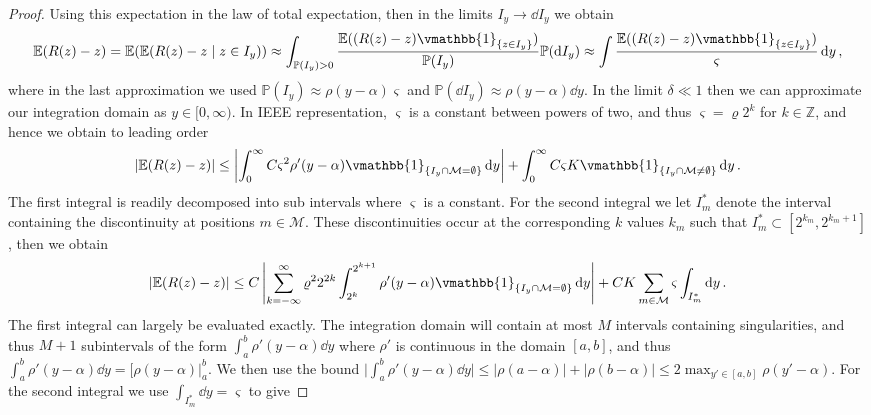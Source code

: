 \documentclass[manuscript,review]{acmart}
\newcommand{\indicatorfn}{\vmathbb{1}}
\begin{document}
\begin{proof}
Using this expectation in the law of total expectation, then in the limits $ I_y \to  \dd{I_y} $ we obtain
\begin{equation*}
\mathbb{E}(R(z) - z)  
=  \mathbb{E}(\mathbb{E}(R(z) - z\mid z\in I_y))  
\approx \int_{\mathbb{P}(I_y) > 0} \dfrac{ \mathbb{E}((R(z) - z)\indicatorfn_{\{z \in I_y\}})}{\mathbb{P}(I_y)} \mathbb{P}(\dd{I_y}) 
\approx \int  \dfrac{ \mathbb{E}((R(z) - z)\indicatorfn_{\{z \in I_y\}})}{\varsigma}  \dd{y},
\end{equation*}
where in the last approximation we used $ \mathbb{P}(I_y) \approx \rho(y - \alpha) \varsigma $ and $ \mathbb{P}(\dd{I_y}) \approx \rho(y - \alpha) \dd{y} $. In the limit $ \delta \ll 1 $ then we can approximate our integration domain as $ y \in  [0, \infty) $. In IEEE representation, $ \varsigma $ is a constant between powers of two, and thus $ \varsigma = \varrho 2^k $  for $ k \in \mathbb{Z} $, and hence we obtain to leading order 
\begin{equation*}
\lvert \mathbb{E}(R(z) - z) \rvert 
\leq 
\left\lvert \int_0^\infty C \varsigma^2 \rho'(y - \alpha) \indicatorfn_{\{I_y\cap \mathcal{M} = \emptyset\}} \dd{y} \right\rvert 
+ \int_0^\infty C \varsigma K \indicatorfn_{\{I_y\cap \mathcal{M} \neq \emptyset\}}\dd{y}.
\end{equation*}
The first integral is readily decomposed into sub intervals where $ \varsigma $ is a constant. For the second integral we let $ I^*_m $ denote the interval containing the discontinuity at positions $ m \in \mathcal{M} $. These discontinuities occur at the corresponding $ k $ values $ k_m $ such that $ I^*_m \subset [2^{k_m}, 2^{k_m + 1}] $, then we obtain
\begin{equation*}
\lvert \mathbb{E}(R(z) - z) \rvert  
\leq C \left\lvert \sum_{k=-\infty}^{\infty} \varrho^2  2^{2k}\int_{2^k}^{2^{k+1}} \rho'(y - \alpha) \indicatorfn_{\{I_y\cap \mathcal{M} = \emptyset\}} \dd{y} \right\rvert 
+ C K \sum_{m \in \mathcal{M}} \varsigma \int_{I^*_m}  \dd{y}. 
\end{equation*}
The first integral can largely be evaluated exactly. The integration domain will contain at most $ M $ intervals containing singularities, and thus $ M+1 $ subintervals of the form $ \int_{a}^{b} \rho'(y-\alpha) \dd{y} $ where $ \rho' $ is continuous in the domain $ [a,b] $, and thus $ \int_{a}^{b} \rho'(y-\alpha) \dd{y} = [\rho(y-\alpha)\rvert_{a}^{b} $. We then use the bound $  \lvert \int_{a}^{b} \rho'(y-\alpha) \dd{y}\rvert \leq \lvert \rho(a-\alpha) \rvert  + \lvert \rho(b-\alpha) \rvert \leq 2 \max_{y'\in[a,b]} \rho(y' - \alpha) $. For the second integral we use $ \int_{I^*_m}  \dd{y} = \varsigma $ to give

\end{proof}
\end{document}
